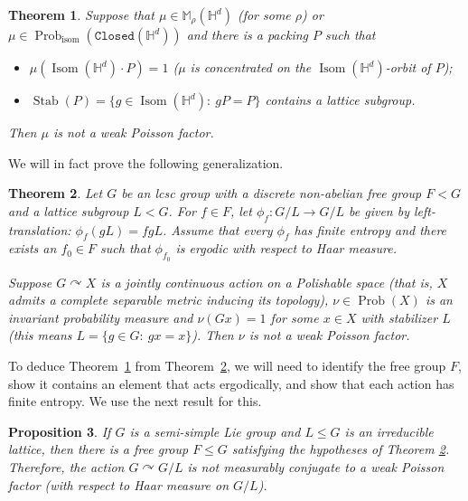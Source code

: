 \documentclass[11pt]{amsart}
\newtheorem{theorem}{Theorem}
\newtheorem{prop}[theorem]{Proposition}
\theoremstyle{definition}
\theoremstyle{remark}
\renewcommand{\H}{\mathbb{H}}
\newcommand{\M}{\mathbb{M}}
\newcommand{\Closed}{\mathtt{Closed}}
\newcommand{\isom}{\operatorname{isom}}
\newcommand{\Isom}{\operatorname{Isom}}
\newcommand{\Prob}{\operatorname{Prob}}
\newcommand{\Stab}{\operatorname{Stab}}
\def\cc{{\curvearrowright}}
\begin{document}
\begin{theorem}\label{thm:periodic-not-Poisson-factor}
    Suppose that $\mu \in \M_\rho(\H^d)$ (for some $\rho$) or $\mu \in \Prob_{\isom} (\Closed(\H^d))$ and there is a packing $P$ such that
 \begin{itemize}
     \item $\mu(\Isom(\H^d)\cdot P)=1$ ($\mu$ is concentrated on the $\Isom(\H^d)$-orbit of $P$);
     \item $\Stab(P)=\{g\in \Isom(\H^d):~gP=P\}$ contains a lattice subgroup. 
 \end{itemize}   
    Then $\mu$ is not a weak Poisson factor.  
\end{theorem}

We will in fact prove the following generalization.





\begin{theorem}\label{T:weak}
Let $G$ be an lcsc group with a discrete non-abelian free group $F<G$ and a lattice subgroup $L<G$. For $f\in F$, let $\phi_f:G/L \to G/L$ be given by left-translation: $\phi_f(gL)=fgL$. Assume that every $\phi_f$ has finite entropy and there exists an $f_0\in F$ such that $\phi_{f_0}$ is ergodic with respect to Haar measure. 

Suppose $G \cc X$ is a jointly continuous action on a Polishable space (that is, $X$ admits a complete separable metric inducing its topology), $\nu \in \Prob(X)$ is an invariant probability measure and $\nu(Gx)=1$ for some $x\in X$ with stabilizer $L$ (this means $L=\{g\in G:~ gx=x\}$). Then $\nu$ is not a weak Poisson factor. 
\end{theorem}

To deduce Theorem~\ref{thm:periodic-not-Poisson-factor} from Theorem~\ref{T:weak}, we will need to identify the free group $F$, show it contains an element that acts ergodically, and show that each action has finite entropy.  We use the next result for this.

\begin{prop}\label{C:weak}
  If $G$ is a semi-simple Lie group  and $L \le G$ is an irreducible  lattice, then there is a free group $F \le G$ satisfying the hypotheses of Theorem \ref{T:weak}. Therefore, the action $G \cc G/L$ is not measurably conjugate to a weak Poisson factor (with respect to Haar measure on $G/L$). 
\end{prop}
\end{document}
